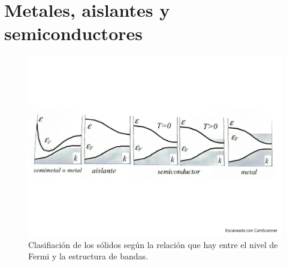 \section{Metales, aislantes y semiconductores}
\begin{figure}[h!] \centering
    \includegraphics[scale=0.5]{Cuerpo/Ch_07/Fotos libro 10.pdf}
    \caption{Clasifiación de los sólidos según la relación que hay entre el nivel de Fermi y la estructura de bandas.}
    \label{Fig:07-10}
\end{figure}    
